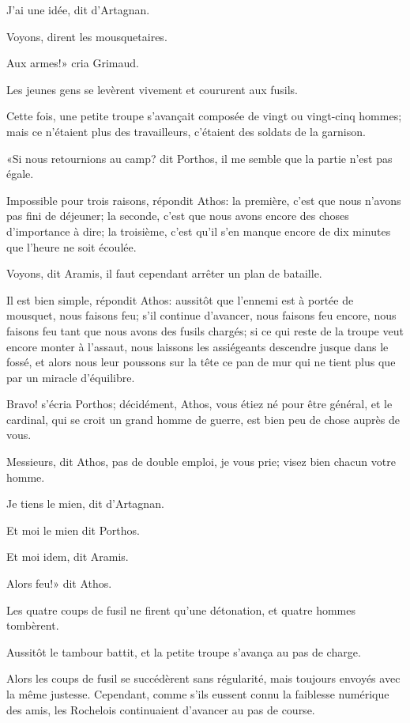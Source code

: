 \speak  J'ai une idée, dit d'Artagnan. 

\speak  Voyons, dirent les mousquetaires. 

\speak  Aux armes!» cria Grimaud. 

Les jeunes gens se levèrent vivement et coururent aux fusils. 

Cette fois, une petite troupe s'avançait composée de vingt ou vingt-cinq hommes; mais ce n'étaient plus des travailleurs, c'étaient des soldats de la garnison. 

«Si nous retournions au camp? dit Porthos, il me semble que la partie n'est pas égale. 

\speak  Impossible pour trois raisons, répondit Athos: la première, c'est que nous n'avons pas fini de déjeuner; la seconde, c'est que nous avons encore des choses d'importance à dire; la troisième, c'est qu'il s'en manque encore de dix minutes que l'heure ne soit écoulée. 

\speak  Voyons, dit Aramis, il faut cependant arrêter un plan de bataille. 

\speak  Il est bien simple, répondit Athos: aussitôt que l'ennemi est à portée de mousquet, nous faisons feu; s'il continue d'avancer, nous faisons feu encore, nous faisons feu tant que nous avons des fusils chargés; si ce qui reste de la troupe veut encore monter à l'assaut, nous laissons les assiégeants descendre jusque dans le fossé, et alors nous leur poussons sur la tête ce pan de mur qui ne tient plus que par un miracle d'équilibre. 

\speak  Bravo! s'écria Porthos; décidément, Athos, vous étiez né pour être général, et le cardinal, qui se croit un grand homme de guerre, est bien peu de chose auprès de vous. 

\speak  Messieurs, dit Athos, pas de double emploi, je vous prie; visez bien chacun votre homme. 

\speak  Je tiens le mien, dit d'Artagnan. 

\speak  Et moi le mien dit Porthos. 

\speak  Et moi idem, dit Aramis. 

\speak  Alors feu!» dit Athos. 

Les quatre coups de fusil ne firent qu'une détonation, et quatre hommes tombèrent. 

Aussitôt le tambour battit, et la petite troupe s'avança au pas de charge. 

Alors les coups de fusil se succédèrent sans régularité, mais toujours envoyés avec la même justesse. Cependant, comme s'ils eussent connu la faiblesse numérique des amis, les Rochelois continuaient d'avancer au pas de course. 

